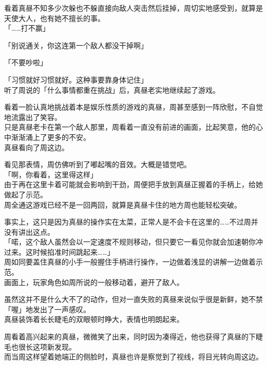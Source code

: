 看着真昼不知多少次躲也不躲直接向敌人突击然后挂掉，周切实地感受到，就算是天使大人，也有她不擅长的事。\\

「……打不赢」

「别说通关，你这连第一个敌人都没干掉啊」

「不要吵啦」

「习惯就好习惯就好。这种事要靠身体记住」\\

听了周说的「什么事情都重在挑战」后，真昼老实地继续起了游戏。

看着一脸认真地挑战着本是娱乐性质的游戏的真昼，周甚至感到一阵欣慰，不自觉地流露出了笑容。\\

只是真昼老卡在第一个敌人那里，周看着一直没有前进的画面，比起笑意，他的心中渐渐涌上了更多的不安。\\

真昼看向了周这边。

看见那表情，周仿佛听到了嘟起嘴的音效。大概是错觉吧。\\

「啊，你看着，这里得这样」\\

由于再在这里卡着可能就会影响到干劲，周便把手放到真昼正握着的手柄上，给她做起了示范。\\

周全通这游戏已经不是一回两回，就算是真昼卡住的地方周也能轻松突破。

事实上，这只是因为真昼的操作实在太菜，正常人是不会卡在这里的……不过周并没有讲出这点。\\

「喏，这个敌人虽然会以一定速度不规则移动，但只要它一看见你就会加速朝你冲过来。这时候掐准时间跳起来……」\\

周如同要盖住真昼的小手一般握住手柄进行操作，一边做着浅显的讲解一边做着示范。\\

画面上，玩家角色如周所说的一般移动着，避开了敌人。

虽然这并不是什么大不了的动作，但对一直失败的真昼来说似乎很是新鲜，她不禁「喔」地发出了一声感叹。\\

真昼装饰着长长睫毛的双眼顿时睁大，表情也明朗起来。

周看着高兴起来的真昼，微微笑了出来，同时因为凑得近，他也获得了真昼的下睫毛也很长这项新发现。\\

而当周这样望着她端正的侧脸时，真昼也许是察觉到了视线，将目光转向周这边。\\

